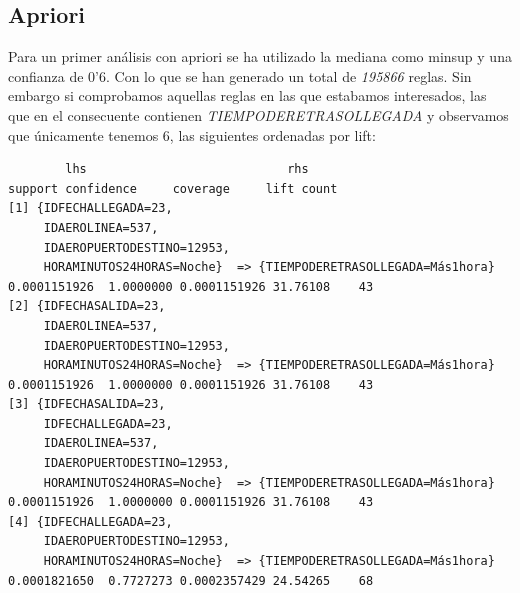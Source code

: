 \documentclass{article}
\begin{document}
\subsection{Apriori}
Para un primer análisis con apriori se ha utilizado la mediana como minsup y una confianza de 0'6. Con lo que se han generado un total de \textit{195866} reglas. Sin embargo si comprobamos aquellas reglas en las que estabamos interesados, las que en el consecuente contienen \textit{TIEMPODERETRASOLLEGADA} y observamos que únicamente tenemos 6, las siguientes ordenadas por lift:
\begin{lstlisting}
        lhs                            rhs                                    support confidence     coverage     lift count
[1] {IDFECHALLEGADA=23,                                                                                                 
     IDAEROLINEA=537,                                                                                                   
     IDAEROPUERTODESTINO=12953,                                                                                         
     HORAMINUTOS24HORAS=Noche}  => {TIEMPODERETRASOLLEGADA=Más1hora} 0.0001151926  1.0000000 0.0001151926 31.76108    43
[2] {IDFECHASALIDA=23,                                                                                                  
     IDAEROLINEA=537,                                                                                                   
     IDAEROPUERTODESTINO=12953,                                                                                         
     HORAMINUTOS24HORAS=Noche}  => {TIEMPODERETRASOLLEGADA=Más1hora} 0.0001151926  1.0000000 0.0001151926 31.76108    43
[3] {IDFECHASALIDA=23,                                                                                                  
     IDFECHALLEGADA=23,                                                                                                 
     IDAEROLINEA=537,                                                                                                   
     IDAEROPUERTODESTINO=12953,                                                                                         
     HORAMINUTOS24HORAS=Noche}  => {TIEMPODERETRASOLLEGADA=Más1hora} 0.0001151926  1.0000000 0.0001151926 31.76108    43
[4] {IDFECHALLEGADA=23,                                                                                                 
     IDAEROPUERTODESTINO=12953,                                                                                         
     HORAMINUTOS24HORAS=Noche}  => {TIEMPODERETRASOLLEGADA=Más1hora} 0.0001821650  0.7727273 0.0002357429 24.54265    68

\end{lstlisting}
\end{document}
